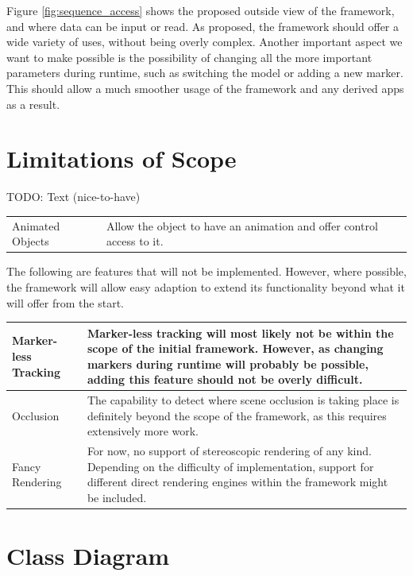 Figure \ref{fig:sequence_access} shows the proposed outside view of the framework, and where data can be input or read.
As proposed, the framework should offer a wide variety of uses, without being overly complex.
Another important aspect we want to make possible is the possibility of changing all the more important parameters during runtime, such as switching the model or adding a new marker.
This should allow a much smoother usage of the framework and any derived apps as a result.

\section{Limitations of Scope}

TODO: Text (nice-to-have)

\begin{tabulary}{\textwidth}{L || L}
Animated Objects & Allow the object to have an animation and offer control access to it.\\
\end{tabulary}

The following are features that will not be implemented.
However, where possible, the framework will allow easy adaption to extend its functionality beyond what it will offer from the start.

\begin{tabulary}{\textwidth}{L || L}
Marker-less Tracking & Marker-less tracking will most likely not be within the scope of the initial framework. However, as changing markers during runtime will probably be possible, adding this feature should not be overly difficult.\\
\hline
Occlusion & The capability to detect where scene occlusion is taking place is definitely beyond the scope of the framework, as this requires extensively more work.\\
\hline
Fancy Rendering & For now, no support of stereoscopic rendering of any kind. Depending on the difficulty of implementation, support for different direct rendering engines within the framework might be included.\\
\end{tabulary}

\section{Class Diagram}

